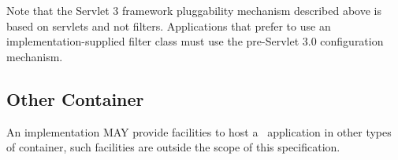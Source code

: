 Note that the Servlet 3 framework pluggability mechanism described above is based on servlets and not filters. Applications that prefer to use an  implementation-supplied filter class must use the pre-Servlet 3.0 configuration mechanism.

\subsection{Other Container}

An implementation MAY provide facilities to host a \jaxrs\ application in other types of container, such facilities are outside the scope of this specification.
